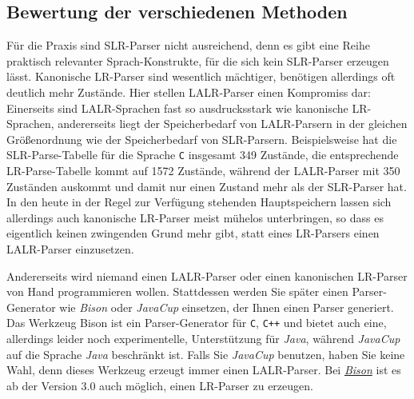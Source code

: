 \subsection{Bewertung der verschiedenen Methoden}
F\"ur die Praxis sind SLR-Parser nicht ausreichend, denn es gibt eine Reihe praktisch
relevanter Sprach-Konstrukte, f\"ur die sich kein SLR-Parser erzeugen l\"asst.  Kanonische
LR-Parser sind wesentlich m\"achtiger, ben\"otigen allerdings oft deutlich mehr Zust\"ande. 
Hier stellen LALR-Parser einen Kompromiss dar:  Einerseits sind LALR-Sprachen fast so
ausdrucksstark  wie kanonische LR-Sprachen, andererseits liegt der Speicherbedarf von
LALR-Parsern in der gleichen Gr\"o{\ss}enordnung wie der Speicherbedarf von SLR-Parsern.  Beispielsweise
hat die SLR-Parse-Tabelle f\"ur die Sprache \texttt{C} insgesamt 349 Zust\"ande, die entsprechende
LR-Parse-Tabelle kommt auf 1572 Zust\"ande, w\"ahrend der LALR-Parser mit 350 Zust\"anden auskommt und damit nur
einen Zustand mehr als der SLR-Parser hat.  
In den heute in der Regel zur Verf\"ugung stehenden Hauptspeichern lassen sich allerdings
auch kanonische LR-Parser meist m\"uhelos unterbringen, so dass es eigentlich keinen zwingenden
Grund mehr gibt, statt eines LR-Parsers einen LALR-Parser einzusetzen.  

Andererseits wird niemand einen LALR-Parser oder einen kanonischen LR-Parser von Hand
programmieren wollen.  Stattdessen werden Sie sp\"ater einen Parser-Generator wie \textsl{Bison}
oder \textsl{JavaCup} einsetzen, der Ihnen einen  Parser generiert.  Das Werkzeug Bison
ist ein Parser-Generator f\"ur \texttt{C}, \texttt{C++} und bietet auch eine, allerdings leider noch
experimentelle, Unterst\"utzung f\"ur \textsl{Java},
w\"ahrend \textsl{JavaCup} auf die Sprache \textsl{Java} beschr\"ankt ist.  Falls Sie
\textsl{JavaCup} benutzen, haben Sie keine Wahl, denn dieses Werkzeug erzeugt immer einen
LALR-Parser.  Bei \href{http://www.gnu.org/software/bison/manual/bison.html}{\textsl{Bison}} ist es
ab der Version 3.0  auch m\"oglich, einen LR-Parser zu erzeugen.



